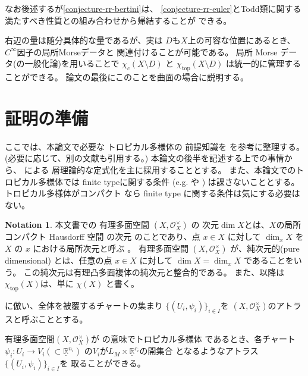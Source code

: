 \documentclass[a4paper,dvipdfmx,reqno,12pt]{amsart}
\theoremstyle{definition}
\newtheorem{notation}[theorem]{Notation}
\newcommand{\opn}[1]{\operatorname{#1}}
\numberwithin{equation}{section}
\begin{document}
なお後述するが\cref{conjecture-rr-bertini}は、
\cref{conjecture-rr-euler}とTodd類に関する
満たすべき性質との組み合わせから帰結することが
できる。

右辺の量は随分具体的な量であるが、実は
$D$も$X$上の可容な位置にあるとき、
$C^{\infty}$因子の局所Morseデータと
関連付けることが可能である。
局所 Morse データ(の一般化論)を用いることで
$\chi_c(X\setminus D)$ と
$\chi_{\mathrm{top}}(X\setminus D)$
は統一的に管理することができる。
論文の最後にこのことを曲面の場合に説明する。

\section{証明の準備}

ここでは、本論文で必要な
トロピカル多様体の
前提知識を
\cite{mikhalkin2018tropical,gross2019sheaftheoretic,demedrano2023chern}
を参考に整理する。
(必要に応じて、別の文献も引用する。)
本論文の後半を記述する上での事情から、
\cite{gross2019sheaftheoretic}による
層理論的な定式化を主に採用することとする。
また、本論文でのトロピカル多様体では
finite typeに関する条件
(e.g. \cite[Definition 7.1.14]{mikhalkin2018tropical} や
\cite[Definition 2.3 (4)]{demedrano2023chern})
は課さないこととする。トロピカル多様体がコンパクト
なら finite type に関する条件は気にする必要はない。

\begin{notation}
本文書での
有理多面空間 $(X,\mathcal{O}_X^{\times})$ の
次元$\dim X$とは、$X$の局所コンパクト Hausdorff 空間
の次元\cite[Chapter III. Definition 9.4]{MR842190}
のことであり、点 $x\in X$ に対して
$\dim_x X$ を $X$ の $x$ における局所次元と呼ぶ
\cite[Chapter III. Definition 9.10]{MR842190}。
有理多面空間
$(X,\mathcal{O}_X^{\times})$
が、純次元的(pure dimensional)
とは、任意の点 $x\in X$ に対して
$\dim X=\dim_x X$ であることをいう。
この純次元は有理凸多面複体の純次元と整合的である。
また、以降は
$\chi_{\opn{top}}(X)$は、単に
$\chi(X)$ と書く。
\end{notation}

\cite{demedrano2023chern}に倣い、全体を被覆するチャートの集まり
$\{(U_i,\psi_i)\}_{i\in I}$を
$(X,\mathcal{O}_X^{\times})$のアトラスと呼ぶこととする。

有理多面空間$(X,\mathcal{O}_X^{\times})$が
\cite[Definition 6.1]{gross2019sheaftheoretic}の意味でトロピカル多様体
であるとき、各チャート
$\psi_i\colon U_i\to V_i(\subset \underline{\mathbb{R}}^{n_i})$
の$V_i$が$L_M\times \underline{\mathbb{R}}^{r_i}$の開集合
となるようなアトラス$\{(U_i,\psi_i)\}_{i\in I}$を
取ることができる。
\end{document}
